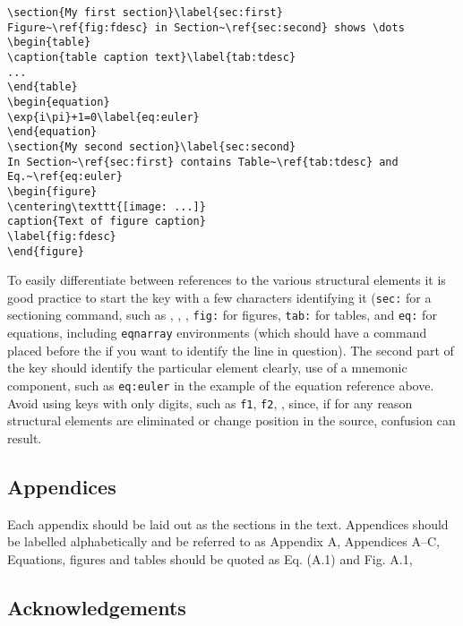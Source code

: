 \documentclass{cernyrep}
\begin{document}
\begin{verbatim}
\section{My first section}\label{sec:first}
Figure~\ref{fig:fdesc} in Section~\ref{sec:second} shows \dots
\begin{table}
\caption{table caption text}\label{tab:tdesc}
...
\end{table}
\begin{equation}
\exp{i\pi}+1=0\label{eq:euler}
\end{equation}
\section{My second section}\label{sec:second}
In Section~\ref{sec:first} contains Table~\ref{tab:tdesc} and
Eq.~\ref{eq:euler}
\begin{figure}
\centering\texttt{[image: ...]}
caption{Text of figure caption}
\label{fig:fdesc}
\end{figure}
\end{verbatim}
To easily differentiate between references to the various structural
elements it is good practice to start the key with a few characters
identifying it (\eg \texttt{sec:} for a sectioning command, such as
, , \etc, \texttt{fig:} for figures,
\texttt{tab:} for tables, and \texttt{eq:} for equations, including
\texttt{eqnarray} environments (which should have a 
command placed before the \Lcs{\bs} if you want to identify the line
in question). The second part of the key should identify the
particular element clearly, \eg use of a mnemonic component, such as
\texttt{eq:euler} in the example of the equation reference
above. Avoid using keys with only digits, such as \texttt{f1},
\texttt{f2}, \etc, since, if for any reason structural elements are
eliminated or change position in the source, confusion can result.

\subsection{Appendices}

Each appendix should be laid out as the sections in the text.
Appendices should be labelled alphabetically and be referred to as
Appendix A, Appendices A--C, \etc Equations, figures and tables should
be quoted as Eq. (A.1) and Fig. A.1, \etc

\subsection{Acknowledgements}
\end{document}
